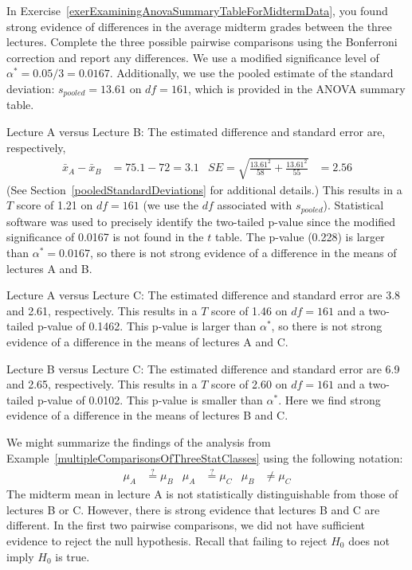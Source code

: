 \begin{example}{In Exercise~\ref{exerExaminingAnovaSummaryTableForMidtermData}, you found strong evidence of differences in the average midterm grades between the three lectures. Complete the three possible pairwise comparisons using the Bonferroni correction and report any differences.} \label{multipleComparisonsOfThreeStatClasses}
We use a modified significance level of $\alpha^* = 0.05/3 = 0.0167$. Additionally, we use the pooled estimate of the standard deviation: $s_{pooled}=13.61$ on $df=161$, which is provided in the ANOVA summary table.

Lecture A versus Lecture B: The estimated difference and standard error are, respectively,
\begin{align*}
\bar{x}_A - \bar{x}_{B} &= 75.1 - 72 = 3.1
	&SE = \sqrt{\frac{13.61^2}{58} + \frac{13.61^2}{55}} &= 2.56
\end{align*}
(See Section~\vref{pooledStandardDeviations} for additional details.) This results in a $T$ score of 1.21 on $df = 161$ (we use the $df$ associated with $s_{pooled}$). Statistical software was used to precisely identify the two-tailed p-value since the modified significance of 0.0167 is not found in the $t$ table. The p-value (0.228) is larger than $\alpha^*=0.0167$, so there is not strong evidence of a difference in the means of lectures A and B.

Lecture A versus Lecture C: The estimated difference and standard error are 3.8 and 2.61, respectively. This results in a $T$ score of 1.46 on $df = 161$ and a two-tailed p-value of 0.1462. This p-value is larger than $\alpha^*$, so there is not strong evidence of a difference in the means of lectures A and C.

Lecture B versus Lecture C: The estimated difference and standard error are 6.9 and 2.65, respectively. This results in a $T$ score of 2.60 on $df = 161$ and a two-tailed p-value of 0.0102. This p-value is smaller than $\alpha^*$. Here we find strong evidence of a difference in the means of lectures B and C.
\end{example}

We might summarize the findings of the analysis from Example~\ref{multipleComparisonsOfThreeStatClasses} using the following notation:
\begin{align*}
\mu_A &\stackrel{?}{=} \mu_B
	&\mu_A &\stackrel{?}{=} \mu_C
	&\mu_B &\neq \mu_C
\end{align*}
The midterm mean in lecture A is not statistically distinguishable from those of lectures B or C. However, there is strong evidence that lectures B and C are different. In the first two pairwise comparisons, we did not have sufficient evidence to reject the null hypothesis. Recall that failing to reject $H_0$ does not imply $H_0$ is true.

